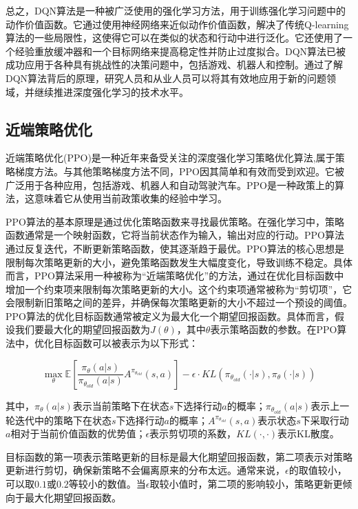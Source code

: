 总之，DQN算法是一种被广泛使用的强化学习方法，用于训练强化学习问题中的动作价值函数。它通过使用神经网络来近似动作价值函数，解决了传统Q-learning算法的一些局限性，这使得它可以在类似的状态和行动中进行泛化。它还使用了一个经验重放缓冲器和一个目标网络来提高稳定性并防止过度拟合。DQN算法已被成功应用于各种具有挑战性的决策问题中，包括游戏、机器人和控制。通过了解DQN算法背后的原理，研究人员和从业人员可以将其有效地应用于新的问题领域，并继续推进深度强化学习的技术水平。


\subsection{近端策略优化}

近端策略优化(PPO)是一种近年来备受关注的深度强化学习策略优化算法,属于策略梯度方法。与其他策略梯度方法不同，PPO因其简单和有效而受到欢迎。它被广泛用于各种应用，包括游戏、机器人和自动驾驶汽车。PPO是一种政策上的算法，这意味着它从使用当前政策收集的经验中学习。

PPO算法的基本原理是通过优化策略函数来寻找最优策略。在强化学习中，策略函数通常是一个映射函数，它将当前状态作为输入，输出对应的行动。PPO算法通过反复迭代，不断更新策略函数，使其逐渐趋于最优。PPO算法的核心思想是限制每次策略更新的大小，避免策略函数发生大幅度变化，导致训练不稳定。具体而言，PPO算法采用一种被称为“近端策略优化”的方法，通过在优化目标函数中增加一个约束项来限制每次策略更新的大小。这个约束项通常被称为“剪切项”，它会限制新旧策略之间的差异，并确保每次策略更新的大小不超过一个预设的阈值。PPO算法的优化目标函数通常被定义为最大化一个期望回报函数。具体而言，假设我们要最大化的期望回报函数为$J(\theta)$，其中$\theta$表示策略函数的参数。在PPO算法中，优化目标函数可以被表示为以下形式：

$$\max_{\theta}\mathbb{E}\left[\frac{\pi_{\theta}(a|s)}{\pi_{\theta_{old}}(a|s)}A^{\pi_{\theta_{old}}}(s,a)\right]-\epsilon\cdot KL\left(\pi_{\theta_{old}}(\cdot|s),\pi_{\theta}(\cdot|s)\right)$$

其中，$\pi_{\theta}(a|s)$表示当前策略下在状态$s$下选择行动$a$的概率；$\pi_{\theta_{old}}(a|s)$表示上一轮迭代中的策略下在状态$s$下选择行动$a$的概率；$A^{\pi_{\theta_{old}}}(s,a)$表示状态$s$下采取行动$a$相对于当前价值函数的优势值；$\epsilon$表示剪切项的系数，$KL(\cdot,\cdot)$表示KL散度。

目标函数的第一项表示策略更新的目标是最大化期望回报函数，第二项表示对策略更新进行剪切，确保新策略不会偏离原来的分布太远。通常来说，$\epsilon$的取值较小，可以取$0.1$或$0.2$等较小的数值。当$\epsilon$取较小值时，第二项的影响较小，策略更新更倾向于最大化期望回报函数。

